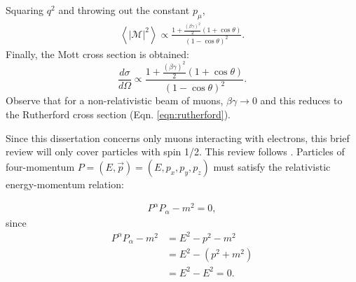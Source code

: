 Squaring $q^2$ and throwing out the constant $p_\mu$,
\begin{align*}
\left< |\mathcal{M}|^2\right> \propto \frac{1+\frac{(\beta\gamma)^2}{2} (1+\cos\theta)  }{(1-\cos\theta)^2}.
\end{align*}
Finally, the Mott cross section is obtained:
\begin{equation}\label{eqn:MottCrossSection_apx}
\frac{d\sigma}{d\Omega} \propto \frac{1+\frac{(\beta\gamma)^2}{2} (1+\cos\theta)  }{(1-\cos\theta)^2}.
\end{equation}
Observe that for a non-relativistic beam of muons, $\beta\gamma \rightarrow 0$ and this reduces to the Rutherford cross section (Eqn. \ref{eqn:rutherford}).
 \label{apx:particlePhysicsReview}

Since this dissertation concerns only muons interacting with electrons, this
brief review will only cover particles with spin 1/2. This review follows
\cite{griffithspp}.
Particles of four-momentum $P=(E, \vec{p})=(E,p_x,p_y,p_z)$ must satisfy the
relativistic
energy-momentum relation:

\begin{gather} \label{eqn:energyMomentumRelation}
P^{\alpha}P_\alpha - m^2 = 0,
\end{gather}
since
\begin{align*}
P^{\alpha}P_\alpha - m^2&=E^2-p^2-m^2 \\ &=E^2-(p^2+m^2) \\ &=E^2-E^2=0.
\end{align*}

